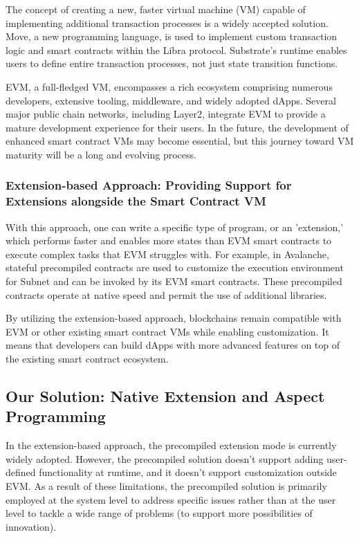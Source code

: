 The concept of creating a new, faster virtual machine (VM) capable of implementing additional transaction processes is a widely accepted solution. Move, a new programming language, is used to implement custom transaction logic and smart contracts within the Libra protocol. Substrate's runtime enables users to define entire transaction processes, not just state transition functions.

EVM, a full-fledged VM, encompasses a rich ecosystem comprising numerous developers, extensive tooling, middleware, and widely adopted dApps. Several major public chain networks, including Layer2, integrate EVM to provide a mature development experience for their users. In the future, the development of enhanced smart contract VMs may become essential, but this journey toward VM maturity will be a long and evolving process.

\subsubsection{Extension-based Approach: Providing Support for Extensions alongside the Smart Contract VM}

With this approach, one can write a specific type of program, or an 'extension,' which performs faster and enables more states than EVM smart contracts to execute complex tasks that EVM struggles with. For example, in Avalanche, stateful precompiled contracts are used to customize the execution environment for Subnet and can be invoked by its EVM smart contracts. These precompiled contracts operate at native speed and permit the use of additional libraries.

By utilizing the extension-based approach, blockchains remain compatible with EVM or other existing smart contract VMs while enabling customization. It means that developers can build dApps with more advanced features on top of the existing smart contract ecosystem.

\subsection{Our Solution: Native Extension and Aspect Programming}

In the extension-based approach, the precompiled extension mode is currently widely adopted. However, the precompiled solution doesn’t support adding user-defined functionality at runtime, and it doesn't support customization outside EVM. As a result of these limitations, the precompiled solution is primarily employed at the system level to address specific issues rather than at the user level to tackle a wide range of problems (to support more possibilities of innovation).

